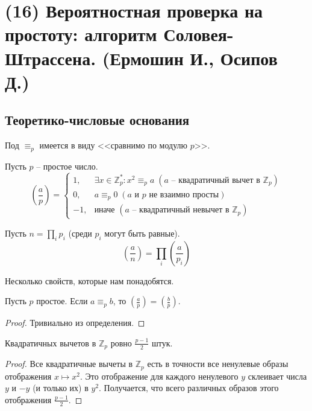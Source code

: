 \newcommand{\divisible}{\mathop{\raisebox{-2pt}{\vdots}}}
\section{(16) Вероятностная проверка на простоту: алгоритм Соловея-Штрассена. (Ермошин И., Осипов Д.)}

\subsection{Теоретико-числовые основания}
Под $\equiv_p$ имеется в виду <<сравнимо по модулю $p$>>.
\begin{definition*} Пусть $p$ -- простое число.
$$\left(\frac{a}{p}\right) = \begin{cases}
1,  & \exists x\in\mathbb{Z}_p^*: x^2\equiv_p a \; (a \text{~-- квадратичный вычет в } \mathbb Z_p)\\
0,  & a\equiv_p0 \; (a \text{ и } p \text{ не взаимно просты})\\
-1, & \text{иначе } (a \text{~-- квадратичный невычет в } \mathbb Z_p)
\end{cases}$$
\end{definition*}

\begin{definition*} Пусть $n = \prod_i p_i$ (среди $p_i$ могут быть равные).
$$\left(\frac{a}{n}\right)=\prod_i \left(\frac{a}{p_i}\right)$$
\end{definition*}

Несколько свойств, которые нам понадобятся.

\begin{lemma} \hypertarget{aequivb}{}
Пусть $p$ простое. Если $a \equiv_p b$, то $\left(\frac{a}{p}\right) = \left(\frac{b}{p}\right)$.
\end{lemma}
\begin{proof}
Тривиально из определения.
\end{proof}

\begin{lemma}\label{qresiduelemma} Квадратичных вычетов в $\mathbb Z_p$ ровно $\frac{p-1}{2}$ штук.
\end{lemma}
\begin{proof}
Все квадратичные вычеты в $\mathbb Z_p$ есть в точности все ненулевые образы отображения $x \mapsto x^2$. Это отображение для каждого ненулевого $y$ склеивает числа $y$ и $-y$ (и только их) в $y^2$. Получается, что всего различных образов этого отображения $\frac{p-1}{2}$.
\end{proof}

